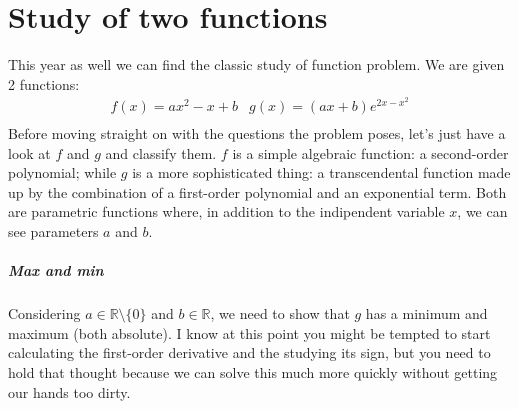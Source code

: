 
\chapter[Study of functions]{Study of two functions}
\label{ch:fun}

This year as well we can find the classic study of function problem. We
are given 2 functions:
\begin{equation*}
    \begin{array}{cc}
        f(x) = ax^2 - x + b & g(x) = (ax + b)e^{2x - x^2} \\
    \end{array}
\end{equation*}
Before moving straight on with the questions the problem poses, let's just have
a look at $f$ and $g$ and
classify
them. $f$ is a simple algebraic function: a second-order polynomial;
while $g$ is a more sophisticated thing: a transcendental function made up
by the combination of a first-order polynomial and an exponential term. Both
are parametric functions where, in addition to the indipendent variable
$x$, we can see parameters $a$ and $b$.

\paragraph[Problem 1]{Max and min}
\label{par:subp1_1}
Considering $a \in \mathbb{R} \setminus \{ 0 \}$ and $b \in \mathbb{R}$, we
need to show that $g$ has a minimum and maximum (both absolute). I know at
this point you might be tempted to start calculating the first-order
derivative and the studying its sign, but you need to hold that thought
because we can solve this much more
quickly without getting our hands too dirty. 

